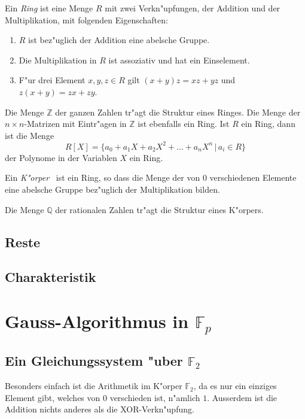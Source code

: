Ein {\em Ring} ist eine Menge $R$ mit zwei Verkn"upfungen, der Addition
und der Multiplikation, mit folgenden Eigenschaften:
\begin{enumerate}[label={\bf R.\arabic*},itemsep=0mm]
\item $R$ ist bez"uglich der Addition eine abelsche Gruppe.
\item Die Multiplikation in $R$ ist assoziativ und hat ein Einselement.
\item F"ur drei Element $x,y,z\in R$ gilt $(x+y)z=xz+yz$ und
$z(x+y)=zx+zy$.
\end{enumerate}

Die Menge $\mathbb Z$ der ganzen Zahlen tr"agt die Struktur eines Ringes.
Die Menge der $n\times n$-Matrizen mit Eintr"agen in $\mathbb Z$ ist ebenfalls
ein Ring.
Ist $R$ ein Ring, dann ist die Menge 
\[
R[X]=\{ a_0+a_1X +a_2X^2+\dots +a_nX^n\,|\,a_i\in R\}
\]
der Polynome in der Variablen $X$ ein Ring.

Ein {\em K"orper}  ist ein Ring, so dass die Menge der von $0$ verschiedenen
Elemente eine abelsche Gruppe bez"uglich der Multiplikation bilden.

Die Menge $\mathbb Q$ der rationalen Zahlen tr"agt die Struktur eines
K"orpers.

\subsection{Reste}

\subsection{Charakteristik}

\section{Gauss-Algorithmus in $\mathbb F_p$}

\subsection{Ein Gleichungssystem "uber $\mathbb F_2$}
Besonders einfach ist die Arithmetik im K"orper $\mathbb F_2$,
da es nur ein einziges Element gibt, welches von $0$ verschieden ist,
n"amlich $1$.
Ausserdem ist die Addition nichts anderes als die XOR-Verkn"upfung.

